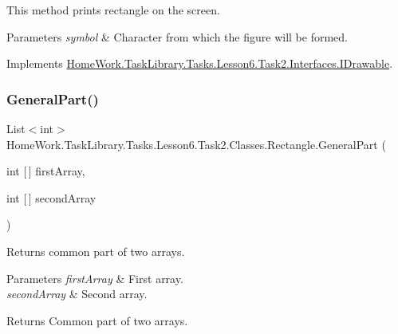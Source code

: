 This method prints rectangle on the screen. 


\begin{DoxyParams}{Parameters}
{\em symbol} & Character from which the figure will be formed.\\
\hline
\end{DoxyParams}


Implements \mbox{\hyperlink{interface_home_work_1_1_task_library_1_1_tasks_1_1_lesson6_1_1_task2_1_1_interfaces_1_1_i_drawable_abf1b3858b298548d8562a5e2229ac564}{Home\+Work.\+Task\+Library.\+Tasks.\+Lesson6.\+Task2.\+Interfaces.\+I\+Drawable}}.

\mbox{\label{class_home_work_1_1_task_library_1_1_tasks_1_1_lesson6_1_1_task2_1_1_classes_1_1_rectangle_a7335ed33b92312a08648a6bfe29b613d}} 
\subsubsection{\texorpdfstring{GeneralPart()}{GeneralPart()}}
{\footnotesize\ttfamily List$<$int$>$ Home\+Work.\+Task\+Library.\+Tasks.\+Lesson6.\+Task2.\+Classes.\+Rectangle.\+General\+Part (\begin{DoxyParamCaption}\item[{int \mbox{[}$\,$\mbox{]}}]{first\+Array,  }\item[{int \mbox{[}$\,$\mbox{]}}]{second\+Array }\end{DoxyParamCaption})\hspace{0.3cm}{\ttfamily [private]}}



Returns common part of two arrays. 


\begin{DoxyParams}{Parameters}
{\em first\+Array} & First array.\\
\hline
{\em second\+Array} & Second array.\\
\hline
\end{DoxyParams}
\begin{DoxyReturn}{Returns}
Common part of two arrays.
\end{DoxyReturn}
\mbox{\label{class_home_work_1_1_task_library_1_1_tasks_1_1_lesson6_1_1_task2_1_1_classes_1_1_rectangle_ae585cf633082fb4d72098a72161d49a5}} 
